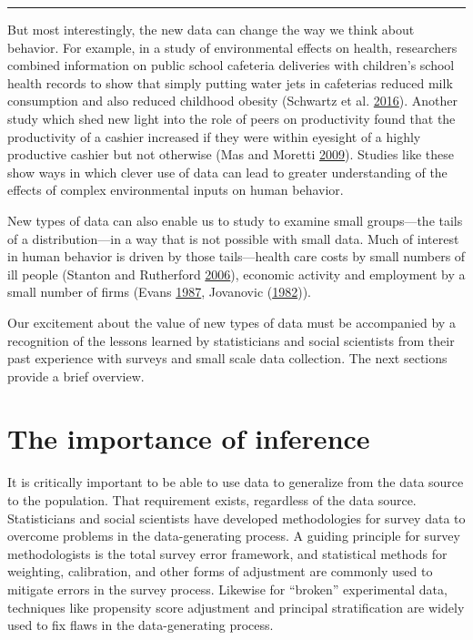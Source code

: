 \documentclass[]{krantz}
\begin{document}
\begin{center}\rule{0.5\linewidth}{\linethickness}\end{center}

But most interestingly, the new data can change the way we think about
behavior. For example, in a study of environmental effects on health,
researchers combined information on public school cafeteria deliveries
with children's school health records to show that simply putting water
jets in cafeterias reduced milk consumption and also reduced childhood
obesity (Schwartz et al.
\protect\hyperlink{ref-schwartz2016effect}{2016}). Another study which
shed new light into the role of peers on productivity found that the
productivity of a cashier increased if they were within eyesight of a
highly productive cashier but not otherwise (Mas and Moretti
\protect\hyperlink{ref-mas2009peers}{2009}). Studies like these show
ways in which clever use of data can lead to greater understanding of
the effects of complex environmental inputs on human behavior.

New types of data can also enable us to study to examine small
groups---the tails of a distribution---in a way that is not possible
with small data. Much of interest in human behavior is driven by those
tails---health care costs by small numbers of ill people (Stanton and
Rutherford \protect\hyperlink{ref-stanton2006high}{2006}), economic
activity and employment by a small number of firms (Evans
\protect\hyperlink{ref-evans1987tests}{1987}, Jovanovic
(\protect\hyperlink{ref-jovanovic1982selection}{1982})).

Our excitement about the value of new types of data must be accompanied
by a recognition of the lessons learned by statisticians and social
scientists from their past experience with surveys and small scale data
collection. The next sections provide a brief overview.

\section{The importance of inference}\label{sec:1.3}

It is critically important to be able to use data to generalize from the
data source to the population. That requirement exists, regardless of
the data source. Statisticians and social scientists have developed
methodologies for survey data to overcome problems in the
data-generating process. A guiding principle for survey methodologists
is the total survey error framework, and statistical methods for
weighting, calibration, and other forms of adjustment are commonly used
to mitigate errors in the survey process. Likewise for ``broken''
experimental data, techniques like propensity score adjustment and
principal stratification are widely used to fix flaws in the
data-generating process.
\end{document}
